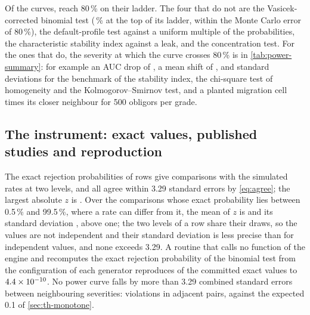 Of the \nPowerTests{} curves, \nReach{} reach 80\,\% on their ladder.
The four that do not are the Vasicek-corrected binomial test (\vasKThree\,\% at the top of its ladder, within the Monte Carlo error of 80\,\%), the default-profile test against a uniform multiple of the probabilities, the characteristic stability index against a leak, and the concentration test.
For the ones that do, the severity at which the curve crosses 80\,\% is in \cref{tab:power-summary}: for example an AUC drop of \ecbDropAtPower, a mean shift of \sPsi, \sChiStab{} and \sKs{} standard deviations for the benchmark of the stability index, the chi-square test of homogeneity and the Kolmogorov--Smirnov test, and a planted migration cell \sMig{} times its closer neighbour for 500 obligors per grade.

\subsection{The instrument: exact values, published studies and reproduction}
\label{sec:rs-instrument}

The exact rejection probabilities of \nExactRows{} rows give \nExactCmp{} comparisons with the simulated rates at two levels, and all \nAgree{} agree within 3.29 standard errors by \eqref{eq:agree}; the largest absolute $z$ is \zMaxAbs.
Over the \nExactNondeg{} comparisons whose exact probability lies between 0.5\,\% and 99.5\,\%, where a rate can differ from it, the mean of $z$ is \zMean{} and its standard deviation \zSd, above one; the two levels of a row share their draws, so the values are not independent and their standard deviation is less precise than for independent values, and none exceeds 3.29.
A routine that calls no function of the engine and recomputes the exact rejection probability of the binomial test from the configuration of each generator reproduces \nBinRecon{} of the committed exact values to $4.4\times10^{-10}$.
No power curve falls by more than 3.29 combined standard errors between neighbouring severities: \nMonoViol{} violations in \nMonoPairs{} adjacent pairs, against the expected 0.1 of \cref{sec:th-monotone}.

